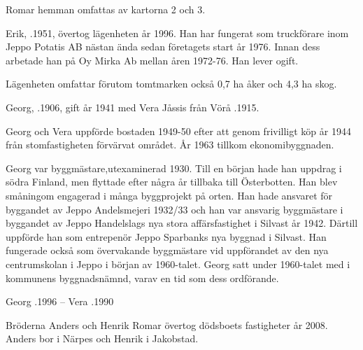 Romar hemman omfattas av kartorna 2 och 3.







Erik, .1951, övertog lägenheten år 1996. Han har fungerat som truckförare inom Jeppo Potatis AB nästan ända sedan företagets start år 1976. Innan dess arbetade han på Oy Mirka Ab mellan åren 1972-76. Han lever ogift.

Lägenheten omfattar förutom tomtmarken också 0,7 ha åker och 4,3 ha skog.


Georg, .1906, gift år 1941 med Vera Jåssis från Vörå .1915.
\begin{jhchildren}
  \item {}
  \item {}
  \item {}
  \item {}
\end{jhchildren}

Georg och Vera uppförde bostaden 1949-50 efter att genom frivilligt köp år 1944 från stomfastigheten förvärvat området. År 1963
tillkom  ekonomibyggnaden.

Georg var byggmästare,utexaminerad 1930. Till en början hade han uppdrag i södra Finland, men flyttade efter några år tillbaka till Österbotten. Han blev småningom engagerad i många byggprojekt på orten. Han hade ansvaret för byggandet av Jeppo Andelsmejeri 1932/33 och  han var ansvarig byggmästare i byggandet av Jeppo Handelslags nya stora affärsfastighet i Silvast år 1942. Därtill uppförde han som entrepenör Jeppo Sparbanks nya byggnad i Silvast. Han fungerade också som övervakande byggmästare vid uppförandet av den nya centrumskolan i Jeppo i början av 1960-talet. Georg satt under 1960-talet med i kommunens byggnadsnämnd, varav en tid som dess ordförande.

Georg .1996  --  Vera .1990



Bröderna Anders och Henrik Romar övertog dödsboets fastigheter år 2008. Anders bor i Närpes och Henrik i Jakobstad.


